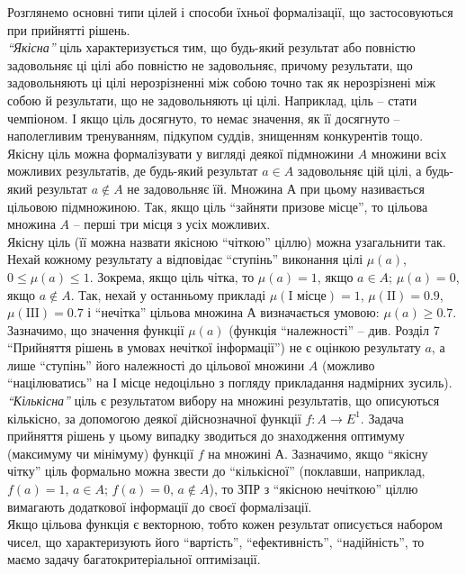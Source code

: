 \begin{enumerate}
	Розглянемо основні типи цілей і способи їхньої формалізації, що застосовуються при прийнятті рішень. \\

	\textit{``Якісна''} ціль характеризується тим, що будь-який результат або повністю задовольняє ці цілі або повністю не задовольняє, причому результати, що задовольняють ці цілі нерозрізненні між собою точно так як нерозрізнені між собою й результати, що не задовольняють ці цілі. Наприклад, ціль -- стати чемпіоном. І якщо ціль досягнуто, то немає значення, як її досягнуто -- наполегливим тренуванням, підкупом суддів, знищенням конкурентів тощо. Якісну ціль можна формалізувати у вигляді деякої підмножини $A$ множини всіх можливих результатів, де будь-який результат $a \in A$ задовольняє цій цілі, а будь-який результат $a \notin A$ не задовольняє їй. Множина А при цьому називається цільовою підмножиною. Так, якщо ціль ``зайняти призове місце'', то цільова множина $A$ -- перші три місця з усіх можливих. \\

	Якісну ціль (її можна назвати якісною ``чіткою'' ціллю) можна узагальнити так. Нехай кожному результату а відповідає ``ступінь'' виконання цілі $\mu(a)$, $0 \le \mu(a) \le 1$. Зокрема, якщо ціль чітка, то $\mu(a) = 1$, якщо $a \in A$; $\mu(a) = 0$, якщо $a \notin A$. Так, нехай у останньому прикладі $\mu(\text{I місце}) = 1$, $\mu(\text{II}) = 0.9$, $\mu(\text{III}) = 0.7$ і ``нечітка'' цільова множина А визначається умовою: $\mu(a) \ge 0.7$. Зазначимо, що значення функції $\mu(a)$ (функція ``належності'' -- див. Розділ 7 ``Прийняття рішень в умовах нечіткої інформації'') не є оцінкою результату $a$, а лише ``ступінь'' його належності до цільової множини $A$ (можливо ``націлюватись'' на І місце недоцільно з погляду прикладання надмірних зусиль). \\

	\textit{``Кількісна''} ціль є результатом вибору на множині результатів, що описуються кількісно, за допомогою деякої дійснозначної функції $f: A \to E^1$. Задача прийняття рішень у цьому випадку зводиться до знаходження оптимуму (максимуму чи мінімуму) функції $f$ на множині $А$. Зазначимо, якщо ``якісну чітку'' ціль формально можна звести до ``кількісної'' (поклавши, наприклад, $f(a) = 1$, $a \in A$; $f(a) = 0$, $a \notin A$), то ЗПР з ``якісною нечіткою'' ціллю вимагають додаткової інформації до своєї формалізації. \\

	Якщо цільова функція є векторною, тобто кожен результат описується набором чисел, що характеризують його ``вартість'', ``ефективність'', ``надійність'', то маємо задачу багатокритеріальної оптимізації. \\


\end{enumerate}
